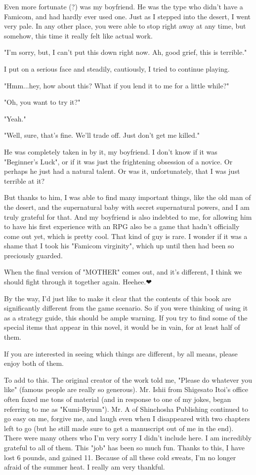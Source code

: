 \documentclass[
]{article}
\begin{document}
Even more fortunate (?) was my boyfriend. He was the type who didn't
have a Famicom, and had hardly ever used one. Just as I stepped into the
desert, I went very pale. In any other place, you were able to stop
right away at any time, but somehow, this time it really felt like
actual work.

"I'm sorry, but, I can't put this down right now. Ah, good grief, this
is terrible."

I put on a serious face and steadily, cautiously, I tried to continue
playing.

"Hmm...hey, how about this? What if you lend it to me for a little
while?"

"Oh, you want to try it?"

"Yeah."

"Well, sure, that's fine. We'll trade off. Just don't get me killed."

He was completely taken in by it, my boyfriend. I don't know if it was
"Beginner's Luck", or if it was just the frightening obsession of a
novice. Or perhaps he just had a natural talent. Or was it,
unfortunately, that I was just terrible at it?

But thanks to him, I was able to find many important things, like the
old man of the desert, and the supernatural baby with secret
supernatural powers, and I am truly grateful for that. And my boyfriend
is also indebted to me, for allowing him to have his first experience
with an RPG also be a game that hadn't officially come out yet, which is
pretty cool. That kind of guy is rare. I wonder if it was a shame that I
took his "Famicom virginity", which up until then had been so preciously
guarded.

When the final version of "MOTHER" comes out, and it's different, I
think we should fight through it together again. Heehee.❤

By the way, I'd just like to make it clear that the contents of this
book are significantly different from the game scenario. So if you were
thinking of using it as a strategy guide, this should be ample warning.
If you try to find some of the special items that appear in this novel,
it would be in vain, for at least half of them.

If you are interested in seeing which things are different, by all
means, please enjoy both of them.

To add to this. The original creator of the work told me, "Please do
whatever you like" (famous people are really so generous). Mr. Ishii
from Shigesato Itoi's office often faxed me tons of material (and in
response to one of my jokes, began referring to me as "Kumi-Byuun"). Mr.
A of Shinchosha Publishing continued to go easy on me, forgive me, and
laugh even when I disappeared with two chapters left to go (but he still
made sure to get a manuscript out of me in the end). There were many
others who I'm very sorry I didn't include here. I am incredibly
grateful to all of them. This "job" has been so much fun. Thanks to
this, I have lost 6 pounds, and gained 11. Because of all these cold
sweats, I'm no longer afraid of the summer heat. I really am very
thankful.
\end{document}
